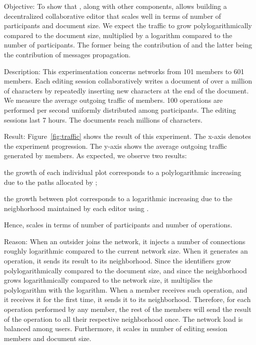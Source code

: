 \begin{asparadesc}
\item [Objective:] To show that \LSEQ, along with other components, allows
  building a decentralized collaborative editor that scales well in terms of
  number of participants and document size. We expect the traffic to grow
  polylogarithmically compared to the document size, multiplied by a logarithm
  compared to the number of participants. The former being the contribution of
  \LSEQ and the latter being the contribution of messages propagation.
\item [Description:] This experimentation concerns networks from 101 members to
  601 members. Each editing session collaboratively writes a document of over a
  million of characters by repeatedly inserting new characters at the end of the
  document. We measure the average outgoing traffic of members. 100 operations
  are performed per second uniformly distributed among participants. The
  editing sessions last 7 hours. The documents reach millions of characters.
\item [Result:] Figure~\ref{fig:traffic} shows the result of this experiment.
  The x-axis denotes the experiment progression. The y-axis shows the average
  outgoing traffic generated by members. As expected, we observe two results:
  \begin{inparaenum}[(i)]
  \item the growth of each individual plot corresponds to a polylogarithmic
    increasing due to the paths allocated by \LSEQ;
  \item the growth between plot corresponds to a logarithmic increasing due to
    the neigbhorhood maintained by each editor using \SPRAY.
  \end{inparaenum}
  Hence, \CRATE scales in terms of number of participants and number of
  operations.
\item [Reason:] When an outsider joins the network, it injects a number of
  connections roughly logarithmic compared to the current network size. When it
  generates an operation, it sends its result to its neighborhood. Since the
  identifiers grow polylogarithmically compared to the document size, and since
  the neighborhood grows logarithmically compared to the network size, it
  multiplies the polylogarithm with the logarithm. When a member receives such
  operation, and it receives it for the first time, it sends it to its
  neighborhood. Therefore, for each operation performed by any member, the rest
  of the members will send the result of the operation to all their respective
  neighborhood once. The network load is balanced among users. Furthermore, it
  scales in number of editing session members and document size.
\end{asparadesc}

